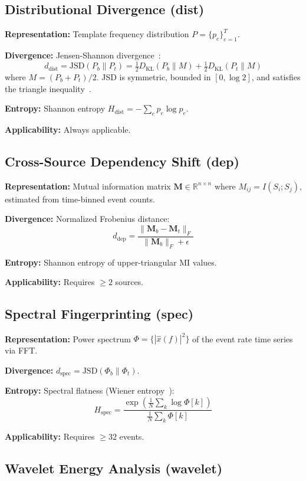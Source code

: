 \documentclass[10pt,twocolumn]{article}
\begin{document}
\subsection{Distributional Divergence (dist)}

\textbf{Representation:} Template frequency distribution $P = \{p_e\}_{e=1}^{T}$.

\textbf{Divergence:} Jensen-Shannon divergence~\cite{lin1991}:
\[
d_{\text{dist}} = \text{JSD}(P_b \| P_t) = \tfrac{1}{2} D_{\text{KL}}(P_b \| M) + \tfrac{1}{2} D_{\text{KL}}(P_t \| M)
\]
where $M = (P_b + P_t)/2$. JSD is symmetric, bounded in $[0, \log 2]$, and satisfies the triangle inequality~\cite{lin1991}.

\textbf{Entropy:} Shannon entropy $H_{\text{dist}} = -\sum_e p_e \log p_e$.

\textbf{Applicability:} Always applicable.

\subsection{Cross-Source Dependency Shift (dep)}

\textbf{Representation:} Mutual information matrix $\mathbf{M} \in \mathbb{R}^{n \times n}$ where $M_{ij} = I(S_i; S_j)$, estimated from time-binned event counts.

\textbf{Divergence:} Normalized Frobenius distance:
\[
d_{\text{dep}} = \frac{\|\mathbf{M}_b - \mathbf{M}_t\|_F}{\|\mathbf{M}_b\|_F + \epsilon}
\]

\textbf{Entropy:} Shannon entropy of upper-triangular MI values.

\textbf{Applicability:} Requires $\geq 2$ sources.

\subsection{Spectral Fingerprinting (spec)}

\textbf{Representation:} Power spectrum $\Phi = \{|\hat{x}(f)|^2\}$ of the event rate time series via FFT.

\textbf{Divergence:} $d_{\text{spec}} = \text{JSD}(\Phi_b \| \Phi_t)$.

\textbf{Entropy:} Spectral flatness (Wiener entropy~\cite{wiener1930}):
\[
H_{\text{spec}} = \frac{\exp\!\left(\frac{1}{N}\sum_k \log \Phi[k]\right)}{\frac{1}{N}\sum_k \Phi[k]}
\]

\textbf{Applicability:} Requires $\geq 32$ events.

\subsection{Wavelet Energy Analysis (wavelet)}
\end{document}
